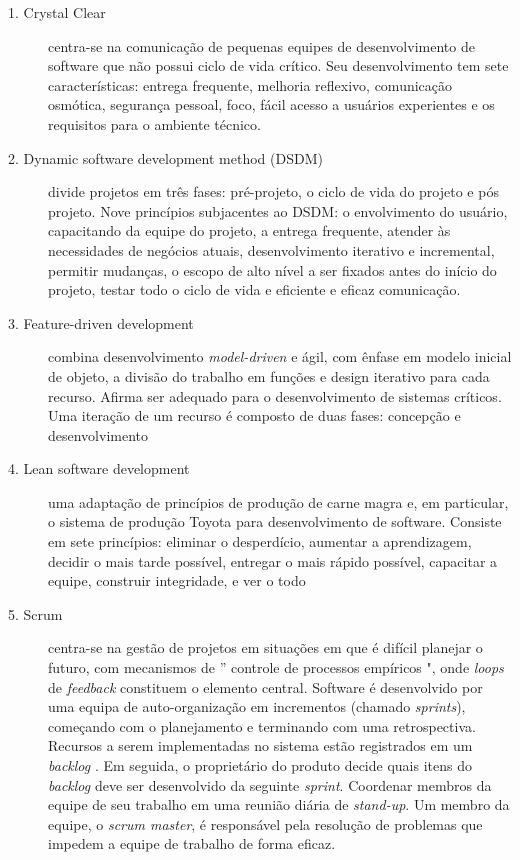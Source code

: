 \begin{mdframed}
\begin{description}

\item [1. Crystal Clear]
%
centra-se na comunicação de pequenas equipes de
desenvolvimento de software que não possui ciclo de vida crítico.
%
Seu desenvolvimento tem sete características: entrega frequente,
melhoria reflexivo, comunicação osmótica, segurança pessoal, foco,
fácil acesso a usuários experientes e os requisitos para o ambiente técnico.

\item [2. Dynamic software development method (DSDM)]
%
divide projetos em três fases: pré-projeto, o ciclo de vida do projeto  e pós projeto. Nove princípios subjacentes ao DSDM: o envolvimento do usuário, capacitando da equipe do projeto,  a entrega frequente, atender às necessidades de negócios atuais,  desenvolvimento iterativo e incremental, permitir mudanças,  o escopo de alto nível a ser fixados antes do início do projeto,  testar todo o ciclo de vida e eficiente e eficaz comunicação.
            
\item [3. Feature-driven development]
%
combina desenvolvimento \textit{model-driven} e ágil, com ênfase  em modelo inicial de objeto, a divisão do trabalho em funções  e design iterativo para cada recurso. Afirma ser adequado para  o desenvolvimento de sistemas críticos. Uma iteração de um  recurso é composto de duas fases: concepção e desenvolvimento
       
\item [4. Lean software development]
%
uma adaptação de princípios de produção de carne magra e,  em particular, o sistema de produção Toyota para desenvolvimento  de software. Consiste em sete princípios: eliminar o desperdício,  aumentar a aprendizagem, decidir o mais tarde possível,  entregar o mais rápido possível, capacitar a equipe,  construir integridade, e ver o todo
                    
\item [5. Scrum]
%
centra-se na gestão de projetos em situações em que é difícil  planejar o futuro, com mecanismos de '' controle de processos  empíricos ", onde \textit{loops} de \textit{feedback} constituem o elemento central.  Software é desenvolvido por uma equipa de auto-organização  em incrementos (chamado \textit{sprints}), começando com o planejamento  e terminando com uma retrospectiva. Recursos a serem implementadas  no sistema estão registrados em um \textit{backlog} . Em seguida,  o proprietário do produto decide quais itens do \textit{backlog} deve ser  desenvolvido da seguinte \textit{sprint}. Coordenar membros da equipe  de seu trabalho em uma reunião diária de \textit{stand-up}. Um membro  da equipe, o \textit{scrum master}, é responsável pela resolução de  problemas que impedem a equipe de trabalho de forma eficaz.
 

\end{description}
\end{mdframed}
